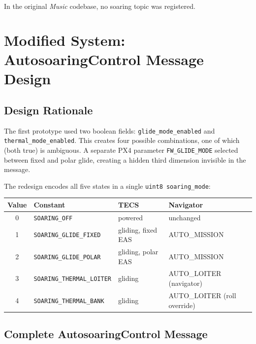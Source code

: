 \documentclass[12pt,a4paper]{report}
\begin{document}
In the original \emph{Music} codebase, no soaring topic was registered.

\section{Modified System: AutosoaringControl Message Design}

\subsection{Design Rationale}

The first prototype used two boolean fields: \texttt{glide\_mode\_enabled}
and \texttt{thermal\_mode\_enabled}. This creates four possible combinations,
one of which (both true) is ambiguous. A separate PX4 parameter
\texttt{FW\_GLIDE\_MODE} selected between fixed and polar glide, creating
a hidden third dimension invisible in the message.

The redesign encodes all five states in a single \texttt{uint8 soaring\_mode}:

\begin{center}
\begin{tabular}{clll}
\toprule
Value & Constant & TECS & Navigator \\
\midrule
0 & \texttt{SOARING\_OFF}            & powered        & unchanged \\
1 & \texttt{SOARING\_GLIDE\_FIXED}   & gliding, fixed EAS & AUTO\_MISSION \\
2 & \texttt{SOARING\_GLIDE\_POLAR}   & gliding, polar EAS & AUTO\_MISSION \\
3 & \texttt{SOARING\_THERMAL\_LOITER}& gliding        & AUTO\_LOITER (navigator) \\
4 & \texttt{SOARING\_THERMAL\_BANK}  & gliding        & AUTO\_LOITER (roll override) \\
\bottomrule
\end{tabular}
\end{center}

\subsection{Complete AutosoaringControl Message}
\end{document}
